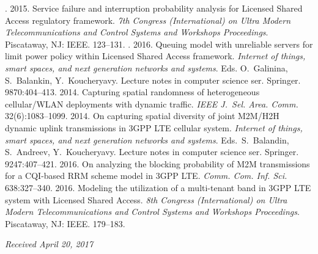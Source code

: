 \begin{multicols}{2}
{{\begin{thebibliography}{99}
. 2015. Service failure 
and interruption probability analysis for Licensed Shared Access regulatory framework. \textit{7th 
Congress (International) on Ultra Modern Telecommunications and Control Systems and Workshops
Proceedings}. Piscataway,  NJ: IEEE. 123--131.
. 2016. Queuing model with 
unreliable servers for limit power policy within Licensed Shared Access framework. 
\textit{Internet of things, smart
spaces, and next generation networks and systems}.
Eds. O.~Galinina, S.~Balankin, Y.~Koucheryavy.
{Lecture 
notes in computer science ser.} Springer. 9870:404--413.
 2014. Capturing spatial randomness of heterogeneous cellular/WLAN 
deployments with dynamic traffic. \textit{IEEE J.~Sel. Area. Comm.}  
32(6):1083--1099.
2014. On capturing spatial diversity of joint M2M/H2H dynamic uplink transmissions in 3GPP 
LTE cellular system. 
\textit{Internet of things, smart
spaces, and next generation networks and systems}.
Eds.\ S.~Balandin, S.~Andreev, Y.~Koucheryavy.
{Lecture notes in computer science ser.} Springer. 9247:407--421.
 2016. On analyzing the 
blocking probability of M2M transmissions for a CQI-based RRM scheme model in 3GPP LTE. 
\textit{Comm. Com. Inf. Sci.} 638:327--340.
 2016. Modeling the utilization of a multi-tenant band in 3GPP LTE system 
with Licensed Shared Access. \textit{8th Congress (International) on Ultra Modern 
Telecommunications and Control Systems and Workshops Proceedings}.  Piscataway, NJ: IEEE.  
179--183.
\end{thebibliography}

 }
 }

\end{multicols}

\vspace*{-9pt}



\hfill{\small\textit{Received April 20, 2017}}


